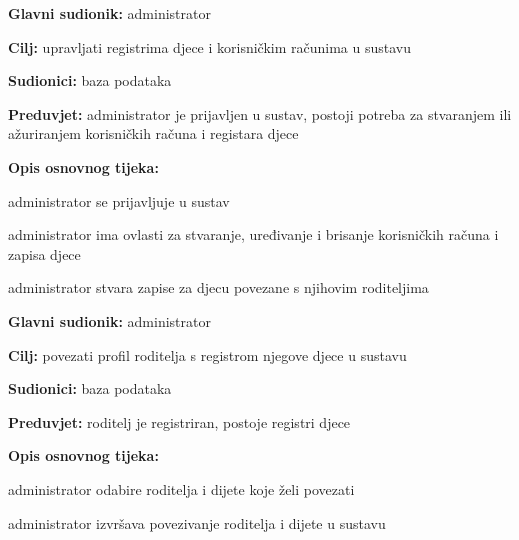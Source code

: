                     
                    \noindent {}
					\begin{packed_item}
	
						\item \textbf{Glavni sudionik: }administrator
						\item  \textbf{Cilj:} upravljati registrima djece i korisničkim računima u sustavu
						\item  \textbf{Sudionici:} baza podataka
						\item  \textbf{Preduvjet:} administrator je prijavljen u sustav, postoji potreba za stvaranjem ili ažuriranjem korisničkih računa i registara djece
						\item  \textbf{Opis osnovnog tijeka:}
						
						\item[] \begin{packed_enum}
	
							\item administrator se prijavljuje u sustav
							\item administrator ima ovlasti za stvaranje, uređivanje i brisanje korisničkih računa i zapisa djece
							\item administrator stvara zapise za djecu povezane s njihovim roditeljima

						\end{packed_enum}
						
					\end{packed_item}

                    \noindent {}
					\begin{packed_item}
	
						\item \textbf{Glavni sudionik: }administrator
						\item  \textbf{Cilj:} povezati profil roditelja s registrom njegove djece u sustavu
						\item  \textbf{Sudionici:} baza podataka
						\item  \textbf{Preduvjet:} roditelj je registriran, postoje registri djece
						\item  \textbf{Opis osnovnog tijeka:}
						
						\item[] \begin{packed_enum}
	
							\item administrator odabire roditelja i dijete koje želi povezati
							\item administrator izvršava povezivanje roditelja i dijete u sustavu
							\item 

						\end{packed_enum}
						
					\end{packed_item}
                    

